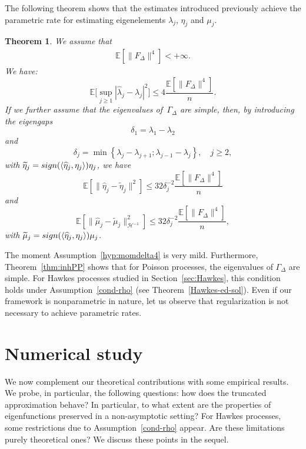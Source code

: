 \documentclass[aos]{imsart}
\theoremstyle{plain}
\newtheorem{theorem}{Theorem}[section]
\theoremstyle{remark}
\newcommand{\vinc}[1]{\textcolor[rgb]{1,0,1}{\textsf{[V: #1]}}}
\newcommand{\1}{1}
\begin{document}
The following theorem shows that the estimates introduced previously achieve the parametric rate for estimating eigenelements $\lambda_j$, $\eta_j$ and $\mu_j$. \begin{theorem}\label{thm:CV_rates}
We assume that 
\begin{eqnarray}\label{hyp:momdelta4}
\mathbb E[\|F_\Delta\|^4]<+\infty.
\end{eqnarray}
We have:
\begin{equation}\label{lambda-est}
\mathbb E\Big[\sup_{j\geq 1}|\widehat\lambda_j-\lambda_j|^2\Big]\leq 4\frac{\mathbb E[\|F_\Delta\|^4]}{n}.
\end{equation}	
If we further assume that the eigenvalues of $\,\Gamma_\Delta$ are simple, then, by introducing the eigengaps \[\delta_1=\lambda_1-\lambda_2\]
and
\[\delta_j=\min\left\{\lambda_j-\lambda_{j+1};\lambda_{j-1}-\lambda_{j}\right\},\quad j\geq 2,\] with $\widetilde\eta_j={\rm sign}(\langle\widehat\eta_j,\eta_j\rangle)\eta_j$, 
we have 
\begin{equation}\label{eta-est}
\mathbb E[\|\widehat\eta_j-\widetilde\eta_j\|^2]\leq32\delta_j^{-2}\frac{\mathbb E[\|F_\Delta\|^4]}{n}
\end{equation}
and
\begin{equation}\label{mu-est}
		\mathbb E\left[\|\widehat\mu_j-\widetilde\mu_j\|^2_{\mathcal H^{-1}}\right]\leq 32\delta_j^{-2}\frac{\mathbb E[\|F_\Delta\|^4]}{n},
		\end{equation}
with $\widetilde\mu_j = {\rm sign}(\langle\widehat\eta_j,\eta_j\rangle)\mu_j$. 		
\end{theorem}
The moment Assumption~\eqref{hyp:momdelta4} is very mild. Furthermore, Theorem~\ref{thm:inhPP} shows that for Poisson processes, the eigenvalues of $\Gamma_\Delta$ are simple. For Hawkes processes studied in Section~\ref{sec:Hawkes}, this condition holds under Assumption~\eqref{cond-rho} (see Theorem~\ref{Hawkes-ed-sol}).
Even if our framework is nonparametric in nature, let us observe that regularization is not necessary to achieve parametric rates.





\section{Numerical study}\label{sec:numerical_study}

We now complement our theoretical contributions with some empirical results. We probe, in particular, the following questions: %
 how does the truncated approximation behave? In particular, to what extent are the properties of eigenfunctions preserved in a non-asymptotic setting? For Hawkes processes, some restrictions due to Assumption~\eqref{cond-rho} appear. Are these limitations purely theoretical ones? We discuss these points in the sequel.
\end{document}
